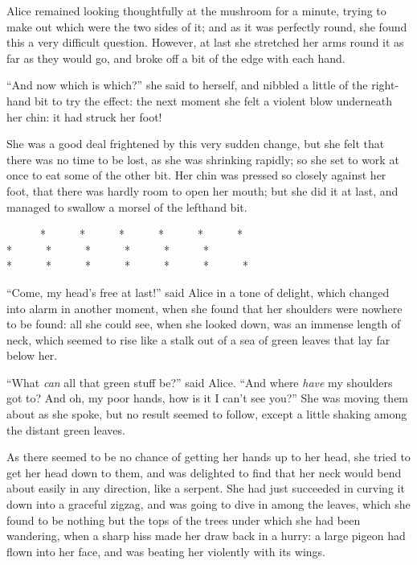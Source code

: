 \documentclass[book, 20pt]{extbook}
\begin{document}
Alice remained looking thoughtfully at the mushroom for a minute, trying
to make out which were the two sides of it; and as it was perfectly
round, she found this a very difficult question. However, at last she
stretched her arms round it as far as they would go, and broke off a bit
of the edge with each hand.

``And now which is which?'' she said to herself, and nibbled a little of
the right-hand bit to try the effect: the next moment she felt a violent
blow underneath her chin: it had struck her foot!

She was a good deal frightened by this very sudden change, but she felt
that there was no time to be lost, as she was shrinking rapidly; so she
set to work at once to eat some of the other bit. Her chin was pressed
so closely against her foot, that there was hardly room to open her
mouth; but she did it at last, and managed to swallow a morsel of the
lefthand bit.

\begin{center}
{\footnotesize ~~~~~~*~~~~~~*~~~~~~*~~~~~~*~~~~~~*~~~~~~*\\
*~~~~~~*~~~~~~*~~~~~~*~~~~~~*~~~~~~*\\
*~~~~~~*~~~~~~*~~~~~~*~~~~~~*~~~~~~*~~~~~~*\\}
\end{center}

\newpage

``Come, my head's free at last!'' said Alice in a tone of delight, which
changed into alarm in another moment, when she found that her shoulders
were nowhere to be found: all she could see, when she looked down, was
an immense length of neck, which seemed to rise like a stalk out of a
sea of green leaves that lay far below her.

``What \emph{can} all that green stuff be?'' said Alice. ``And where
\emph{have} my shoulders got to? And oh, my poor hands, how is it I
can't see you?'' She was moving them about as she spoke, but no result
seemed to follow, except a little shaking among the distant green
leaves.

As there seemed to be no chance of getting her hands up to her head, she
tried to get her head down to them, and was delighted to find that her
neck would bend about easily in any direction, like a serpent. She had
just succeeded in curving it down into a graceful zigzag, and was going
to dive in among the leaves, which she found to be nothing but the tops
of the trees under which she had been wandering, when a sharp hiss made
her draw back in a hurry: a large pigeon had flown into her face, and
was beating her violently with its wings.
\end{document}
